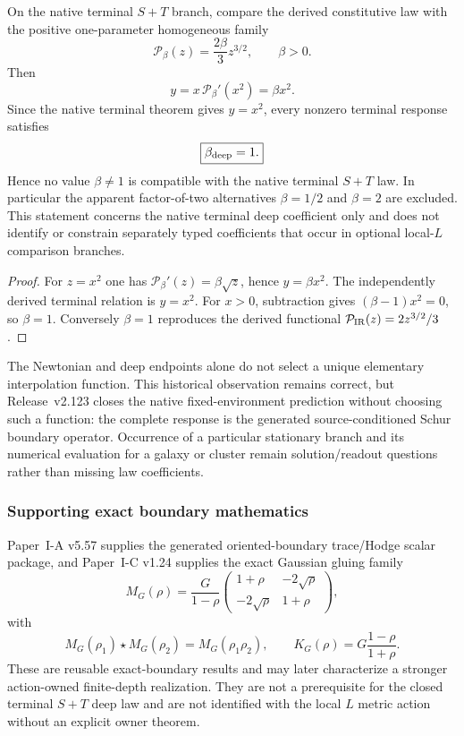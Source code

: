 \documentclass[12pt,a4paper]{article}
\begin{document}
\begin{corollary}
\label{p8:cor:v2102-native-deep-beta-uniqueness}
On the native terminal $S+T$ branch, compare the derived constitutive law with
the positive one-parameter homogeneous family
\[
 \mathcal P_{\beta}(z)=\frac{2\beta}{3}z^{3/2},\qquad \beta>0.
\]
Then
\[
 y=x\,\mathcal P_{\beta}'(x^2)=\beta x^2.
\]
Since the native terminal theorem gives $y=x^2$, every nonzero terminal
response satisfies
\[
 \boxed{\beta_{\rm deep}=1.}
\]
Hence no value $\beta\neq1$ is compatible with the native terminal $S+T$
law.  In particular the apparent factor-of-two alternatives
$\beta=1/2$ and $\beta=2$ are excluded.  This statement concerns the native
terminal deep coefficient only and does not identify or constrain separately
typed coefficients that occur in optional local-$L$ comparison branches.
\end{corollary}
\begin{proof}
For $z=x^2$ one has $\mathcal P_{\beta}'(z)=\beta\sqrt z$, hence
$y=\beta x^2$.  The independently derived terminal relation is $y=x^2$.
For $x>0$, subtraction gives $(\beta-1)x^2=0$, so $\beta=1$.  Conversely
$\beta=1$ reproduces the derived functional
$\mathcal P_{\rm IR}(z)=2z^{3/2}/3$.
\end{proof}

The Newtonian and deep endpoints alone do not select a unique elementary
interpolation function.  This historical observation remains correct, but
Release~v2.123 closes the native fixed-environment prediction without choosing
such a function: the complete response is the generated source-conditioned
Schur boundary operator.  Occurrence of a particular stationary branch and
its numerical evaluation for a galaxy or cluster remain solution/readout
questions rather than missing law coefficients.

\subsubsection{Supporting exact boundary mathematics}
Paper~I-A v5.57 supplies the generated oriented-boundary trace/Hodge scalar
package, and Paper~I-C v1.24 supplies the exact Gaussian gluing family
\[
 M_G(\rho)=\frac{G}{1-\rho}
 \begin{pmatrix}1+\rho&-2\sqrt\rho\\-2\sqrt\rho&1+\rho\end{pmatrix},
\]
with
\[
 M_G(\rho_1)\star M_G(\rho_2)=M_G(\rho_1\rho_2),
 \qquad
 K_G(\rho)=G\frac{1-\rho}{1+\rho}.
\]
These are reusable exact-boundary results and may later characterize a stronger
action-owned finite-depth realization.  They are not a prerequisite for the
closed terminal $S+T$ deep law and are not identified with the local $L$
metric action without an explicit owner theorem.
\end{document}
